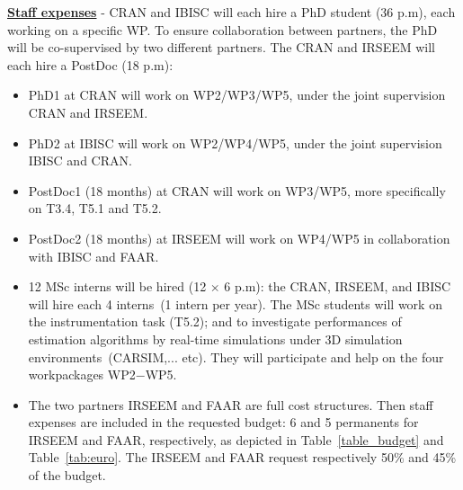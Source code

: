 \documentclass[a4paper,11pt]{article}
\begin{document}
\noindent
\underline{\textbf{Staff expenses}} - CRAN and IBISC will each hire a PhD student (36 p.m), each working on a specific WP. To ensure collaboration between partners, the PhD will be  co-supervised by two different partners. The CRAN and IRSEEM will each hire a PostDoc (18 p.m): 
\begin{itemize}[leftmargin=.25in,noitemsep,nolistsep]
\item PhD1 at CRAN will work on WP2/WP3/WP5, under the joint supervision CRAN and IRSEEM.
\item PhD2 at IBISC will work on WP2/WP4/WP5, under the joint supervision IBISC and CRAN.
\item PostDoc1 (18 months) at CRAN will work on WP3/WP5, more specifically on T3.4, T5.1 and T5.2.
\item PostDoc2 (18 months) at IRSEEM will work on WP4/WP5 in collaboration with IBISC and FAAR.
\item 12 MSc interns will be hired (12 $\times$ 6 p.m): the CRAN, IRSEEM, and IBISC will hire each 4 interns~(1 intern per year). The MSc students will work on the instrumentation task (T5.2); and to investigate performances of estimation algorithms by real-time simulations under 3D simulation environments~(CARSIM,... etc). They will participate and help on the four workpackages WP2$-$WP5.
\item The two partners IRSEEM and FAAR are full cost structures. Then staff expenses are included in the requested budget: 6 and 5 permanents for IRSEEM and FAAR, respectively, as depicted in Table~\ref{table_budget} and Table~\ref{tab:euro}. The IRSEEM and FAAR request respectively 50\% and 45\% of the budget.
\end{itemize}
%
\end{document}
